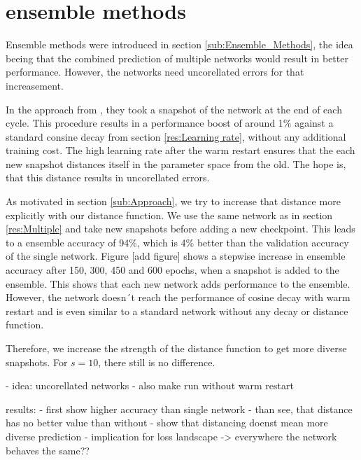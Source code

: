 \section{ensemble methods}
Ensemble methods were introduced in section \ref{sub:Ensemble_Methods}, the idea
beeing that the combined prediction of multiple networks would result in better
performance. However, the networks need uncorellated errors for that
increasement.

In the approach from \cite{loshchilov2016sgdr}, they took a snapshot of the
network at the end of each cycle. This procedure results in a performance boost
of around 1\% against a standard consine decay from section \ref{res:Learning rate},
without any additional training cost. The high learning rate after the warm
restart ensures that the each new snapshot distances itself in the parameter
space from the old. The hope is, that this distance results in uncorellated
errors.

As motivated in section \ref{sub:Approach}, we try to increase that distance
more explicitly with our distance function. We use the same network as in
section \ref{res:Multiple} and take new snapshots before adding a new
checkpoint. This leads to a ensemble accuracy of 94\%, which is 4\% better than
the validation accuracy of the single network. Figure [add figure] shows a
stepwise increase in ensemble accuracy after 150, 300, 450 and 600 epochs, when
a snapshot is added to the ensemble. This shows that each new network adds
performance to the ensemble. However, the network doesn´t reach the performance
of cosine decay with warm restart and is even similar to a standard network
without any decay or distance function.

Therefore, we increase the strength of the distance function to get more diverse
snapshots. For $s=10$, there still is no difference. 



- idea: uncorellated networks
- also make run without warm restart

results:
- first show higher accuracy than single network
- than see, that distance has no better value than without
- show that distancing doenst mean more diverse prediction
- implication for loss landscape -> everywhere the network behaves the same??


